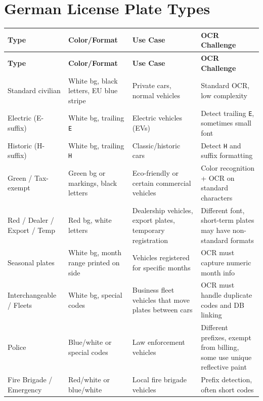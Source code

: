 		\section{German License Plate Types}
		\begin{longtable}{|p{3cm}|p{3cm}|p{3cm}|p{5cm}|}
			\hline
			\textbf{Type} & \textbf{Color/Format} & \textbf{Use Case} & \textbf{OCR Challenge} \\
			\hline
			\endfirsthead
			\hline
			\textbf{Type} & \textbf{Color/Format} & \textbf{Use Case} & \textbf{OCR Challenge} \\
			\hline
			\endhead
			
			Standard civilian & White bg, black letters, EU blue stripe & Private cars, normal vehicles & Standard OCR, low complexity \\
			
			Electric (E-suffix) & White bg, trailing \texttt{E} & Electric vehicles (EVs) & Detect trailing \texttt{E}, sometimes small font \\
			
			Historic (H-suffix) & White bg, trailing \texttt{H} & Classic/historic cars & Detect \texttt{H} and suffix formatting \\
			
			Green / Tax-exempt & Green bg or markings, black letters & Eco-friendly or certain commercial vehicles & Color recognition + OCR on standard characters \\
			
			Red / Dealer / Export / Temp & Red bg, white letters & Dealership vehicles, export plates, temporary registration & Different font, short-term plates may have non-standard formats \\
			
			Seasonal plates & White bg, month range printed on side & Vehicles registered for specific months & OCR must capture numeric month info \\
			
			Interchangeable / Fleets & White bg, special codes & Business fleet vehicles that move plates between cars & OCR must handle duplicate codes and DB linking \\
			
			Police & Blue/white or special codes & Law enforcement vehicles & Different prefixes, exempt from billing, some use unique reflective paint \\
			
			Fire Brigade / Emergency & Red/white or blue/white & Local fire brigade vehicles & Prefix detection, often short codes \\
			

\end{longtable}
